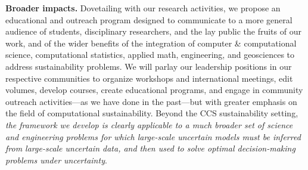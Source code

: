 \documentclass[11pt,final]{article}
\begin{document}
{\bf Broader impacts.}
%
Dovetailing with our research activities, we propose an educational
and outreach program designed to communicate to a more general audience of
students, disciplinary researchers, and the lay public the fruits of
our work, and of the wider benefits of the integration of computer \&
computational science, computational statistics, applied math,
engineering, and geosciences to address sustainability problems.
%
We will parlay our leadership positions in our respective communities
to organize workshops and international meetings, edit volumes, 
develop courses, create educational programs, and engage in community
outreach activities---as we have done in the past---but with greater
emphasis on the field of computational sustainability. Beyond the
CCS sustainability setting,
{\em the framework we develop is clearly applicable to a much broader
  set of science and engineering problems for which large-scale
  uncertain models must be inferred from large-scale uncertain data,
  and then used to solve optimal decision-making problems under
  uncertainty}.
\end{document}
